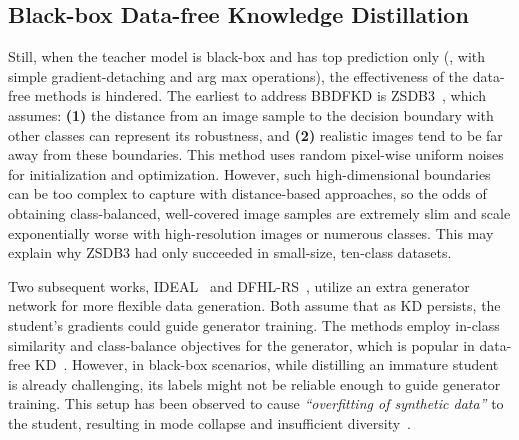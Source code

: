 \subsection{Black-box Data-free Knowledge Distillation} \label{ssec:02-related-bbdfkd}
\begin{foldable} %
    Still, when the teacher model is black-box and has top prediction only (\ie, with simple gradient-detaching and arg max operations), the effectiveness of the data-free methods is hindered.
    The earliest to address BBDFKD is ZSDB3~\cite{wang2021zero}, which assumes: \textbf{(1)} the distance from an image sample to the decision boundary with other classes can represent its robustness, and \textbf{(2)} realistic images tend to be far away from these boundaries.
    This method uses random pixel-wise uniform noises for initialization and optimization.
    However, such high-dimensional boundaries can be too complex to capture with distance-based approaches, so the odds of obtaining class-balanced, well-covered image samples are extremely slim and scale exponentially worse with high-resolution images or numerous classes.
    This may explain why ZSDB3 had only succeeded in small-size, ten-class datasets.
\end{foldable}

\begin{foldable} %
    Two subsequent works, IDEAL~\cite{zhang2022ideal} and DFHL-RS~\cite{yuan2024data}, utilize an extra generator network for more flexible data generation.
    Both assume that as KD persists, the student's gradients could guide generator training.
    The methods employ in-class similarity and class-balance objectives for the generator, which is popular in data-free KD~\cite{chen2019data}.
    However, in black-box scenarios, while distilling an immature student is already challenging, its labels might not be reliable enough to guide generator training.
    This setup has been observed to cause \textit{``overfitting of synthetic data''} to the student, resulting in mode collapse and insufficient diversity~\cite{yuan2024data}.
\end{foldable}
